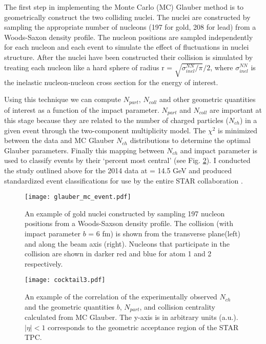 	The first step in implementing the Monte Carlo (MC) Glauber method is to geometrically construct the two colliding nuclei. The nuclei are constructed by sampling the appropriate number of nucleons (197 for gold, 208 for lead) from a Woods-Saxon density profile. The nucleon positions are sampled independently for each nucleon and each event to simulate the effect of fluctuations in nuclei structure. After the nuclei have been constructed their collision is simulated by treating each nucleon like a hard sphere of radius r = $\sqrt{\sigma^{NN}_{inel}/\pi}/2$, where $\sigma^{NN}_{inel}$ is the inelastic nucleon-nucleon cross section for the \snn energy of interest\cite{j.bystricky_energy_1987}. 

	Using this technique we can compute $N_{part}$, $N_{coll}$ and other geometric quantities of interest as a function of the impact parameter. $N_{part}$ and $N_{coll}$ are important at this stage because they are related to the number of charged particles ($N_{ch}$) in a given event through the two-component multiplicity model\cite{fialkowski_high_1973}. The $\chi^2$ is minimized between the data and MC Glauber $N_{ch}$ distributions to determine the optimal Glauber parameters. Finally this mapping between $N_{ch}$ and impact parameter is used to classify events by their `percent most central' (see Fig. \ref{fig:centrality}). I conducted the study outlined above for the 2014 \auau data at \snn = 14.5 GeV and produced standardized event classifications for use by the entire STAR collaboration \cite{brandenburg_refmultcorr}.

	\begin{figure}[ht]
		\texttt{[image: glauber\_mc\_event.pdf]}
		\caption{  \label{fig:mc_glauber} An example of gold nuclei constructed by sampling 197 nucleon positions from a Woods-Saxson density profile\cite{miller_glauber_2007}. The collision (with impact parameter $b$ = 6 fm) is shown from the transverse plane(left) and along the beam axis (right). Nucleons that participate in the collision are shown in darker red and blue for atom 1 and 2 respectively. }
	\end{figure}
	\begin{figure}[ht]
		\centering
		\vspace{-3cm}
		\texttt{[image: cocktail3.pdf]} 
		\caption{ \label{fig:centrality} An example of the correlation of the experimentally observed $N_{ch}$ and the geometric quantities $b$, $N_{part}$, and collision centrality calculated from MC Glauber\cite{miller_glauber_2007}. The y-axis is in arbitrary units (a.u.). $|\eta| < 1$ corresponds to the geometric acceptance region of the STAR TPC.  }
	\end{figure}
		


